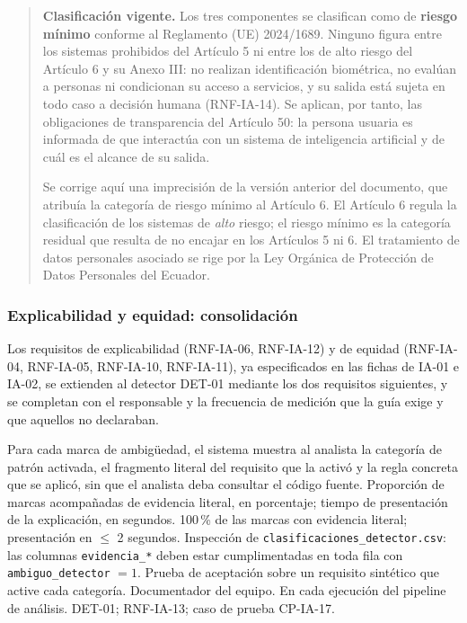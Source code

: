 \documentclass[11pt,a4paper]{article}
\begin{document}
\begin{quote}
\small
\textbf{Clasificación vigente.} Los tres componentes se clasifican como de
\textbf{riesgo mínimo} conforme al Reglamento (UE) 2024/1689. Ninguno figura
entre los sistemas prohibidos del Artículo 5 ni entre los de alto riesgo del
Artículo 6 y su Anexo III: no realizan identificación biométrica, no evalúan a
personas ni condicionan su acceso a servicios, y su salida está sujeta en todo
caso a decisión humana (RNF-IA-14). Se aplican, por tanto, las obligaciones de
transparencia del Artículo 50: la persona usuaria es informada de que
interactúa con un sistema de inteligencia artificial y de cuál es el alcance de
su salida.

Se corrige aquí una imprecisión de la versión anterior del documento, que
atribuía la categoría de riesgo mínimo al Artículo 6. El Artículo 6 regula la
clasificación de los sistemas de \emph{alto} riesgo; el riesgo mínimo es la
categoría residual que resulta de no encajar en los Artículos 5 ni 6. El
tratamiento de datos personales asociado se rige por la Ley Orgánica de
Protección de Datos Personales del Ecuador.
\end{quote}

\subsubsection{Explicabilidad y equidad: consolidación}

Los requisitos de explicabilidad (RNF-IA-06, RNF-IA-12) y de equidad
(RNF-IA-04, RNF-IA-05, RNF-IA-10, RNF-IA-11), ya especificados en las fichas de
IA-01 e IA-02, se extienden al detector DET-01 mediante los dos requisitos
siguientes, y se completan con el responsable y la frecuencia de medición que
la guía exige y que aquellos no declaraban.

{Para cada marca de ambigüedad, el sistema muestra al analista la categoría de
patrón activada, el fragmento literal del requisito que la activó y la regla
concreta que se aplicó, sin que el analista deba consultar el código fuente.}
{Proporción de marcas acompañadas de evidencia literal, en porcentaje; tiempo
de presentación de la explicación, en segundos.}
{100\,\% de las marcas con evidencia literal; presentación en $\leq$ 2
segundos.}
{Inspección de \texttt{clasificaciones\_detector.csv}: las columnas
\texttt{evidencia\_*} deben estar cumplimentadas en toda fila con
\texttt{ambiguo\_detector} $=1$. Prueba de aceptación sobre un requisito
sintético que active cada categoría.}
{Documentador del equipo.}
{En cada ejecución del pipeline de análisis.}
{DET-01; RNF-IA-13; caso de prueba CP-IA-17.}
\end{document}
